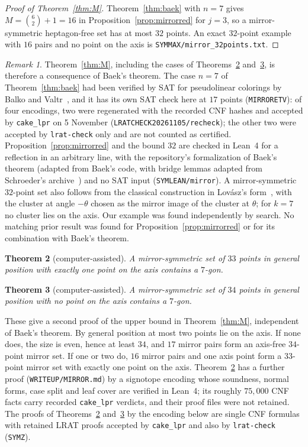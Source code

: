\documentclass[11pt]{article}
\newtheorem{theorem}{Theorem}
\theoremstyle{remark}
\newtheorem{remark}[theorem]{Remark}
\begin{document}
\begin{proof}[Proof of Theorem~\ref{thm:M}]
Theorem~\ref{thm:baek} with $n=7$ gives $M=\binom{6}{2}+1=16$ in Proposition~\ref{prop:mirrorred} for $j=3$, so a
mirror-symmetric heptagon-free set has at most $32$ points. An exact $32$-point example with $16$ pairs and no point on
the axis is \texttt{SYMMAX/mirror\_32points.txt}.
\end{proof}

\begin{remark}\label{rem:mirrorcredit}
Theorem~\ref{thm:M}, including the cases of Theorems~\ref{thm:M33} and~\ref{thm:M34}, is therefore a consequence of
Baek's theorem. The case $n=7$ of Theorem~\ref{thm:baek} had been verified by SAT for pseudolinear colorings by Balko
and Valtr~\cite{BV15}, and it has its own SAT check here at $17$ points (\texttt{MIRRORETV}): of four encodings, two were regenerated with
the recorded CNF hashes and accepted by \texttt{cake\_lpr} on 5 November (\texttt{LRATCHECK20261105/recheck}); the other
two were accepted by \texttt{lrat-check} only and are not counted as certified. Proposition~\ref{prop:mirrorred} and the bound $32$ are checked in Lean~4 for a
reflection in an arbitrary line, with the repository's formalization of Baek's theorem (adapted from Baek's code, with
bridge lemmas adapted from Schroeder's archive~\cite{Sch26}) and no SAT input (\texttt{SYMLEAN/mirror}). A
mirror-symmetric $32$-point set also follows from the classical construction in Lov\'asz's form~\cite[Thm.~2.6]{MS00},
with the cluster at angle $-\theta$ chosen as the mirror image of the cluster at $\theta$; for $k=7$ no cluster lies on
the axis. Our example was found independently by search. No matching prior result was found for
Proposition~\ref{prop:mirrorred} or for its combination with Baek's theorem.
\end{remark}

\begin{theorem}[computer-assisted]\label{thm:M33}
A mirror-symmetric set of $33$ points in general position with exactly one point on the axis contains a $7$-gon.
\end{theorem}
\begin{theorem}[computer-assisted]\label{thm:M34}
A mirror-symmetric set of $34$ points in general position with no point on the axis contains a $7$-gon.
\end{theorem}
These give a second proof of the upper bound in Theorem~\ref{thm:M}, independent of Baek's theorem. By general position at
most two points lie on the axis. If none does, the size is even, hence at least $34$, and $17$ mirror pairs form an
axis-free $34$-point mirror set. If one or two do, $16$ mirror pairs and one axis point form a $33$-point mirror set with
exactly one point on the axis. Theorem~\ref{thm:M33} has a further proof (\texttt{WRITEUP/MIRROR.md}) by a signotope
encoding whose soundness, normal forms, case split and leaf cover are verified in Lean~4; its roughly $75{,}000$ CNF facts
carry recorded \texttt{cake\_lpr} verdicts, and their proof files were not retained. The proofs of
Theorems~\ref{thm:M33} and~\ref{thm:M34} by the encoding below are single CNF formulas with retained LRAT proofs accepted
by \texttt{cake\_lpr} and also by \texttt{lrat-check} (\texttt{SYMZ}).
\end{document}
